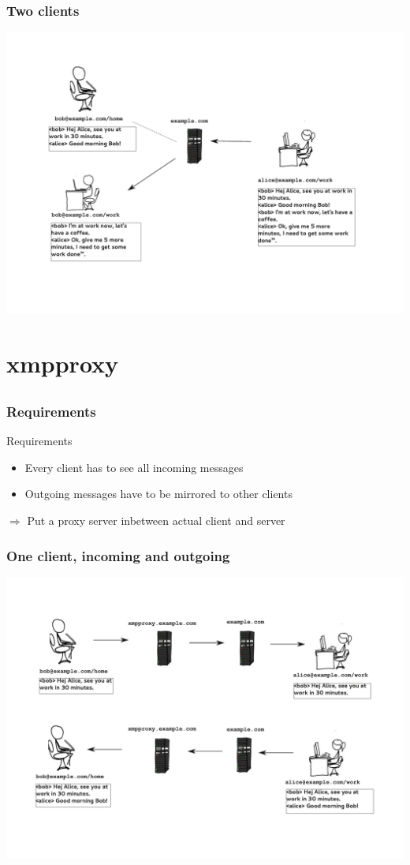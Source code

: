 \documentclass[notes=hide,yellow]{beamer}
\begin{document}
	\begin{frame}
		\frametitle{Two clients}
		\includegraphics[scale=0.4]{../img/conversation3.pdf}
	\end{frame}
	
	\section{xmpproxy}
	\subsection*{}
	\begin{frame}
		\frametitle{Requirements}
		\begin{block}{Requirements}
			\begin{itemize}
					\item Every client has to see all incoming messages
					\item Outgoing messages have to be mirrored to other clients
			\end{itemize}
		\end{block}
		$\Rightarrow$ Put a proxy server inbetween actual client and server
	\end{frame}
	
	\begin{frame}
		\frametitle{One client, incoming and outgoing}
		\includegraphics[scale=0.4]{../img/proxy1.pdf}
	\end{frame}
	
\end{document}

